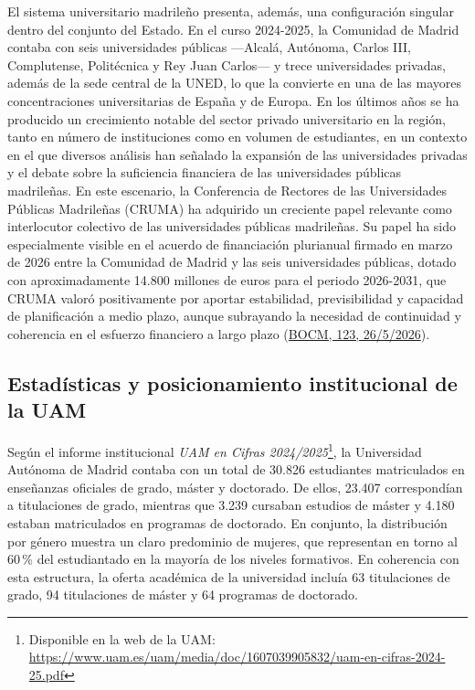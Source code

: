 \documentclass[
  11pt,
  a4paper,
  twoside]{scrreprt}
\begin{document}
El sistema universitario madrileño presenta, además, una configuración
singular dentro del conjunto del Estado. En el curso 2024-2025, la
Comunidad de Madrid contaba con seis universidades públicas ---Alcalá,
Autónoma, Carlos III, Complutense, Politécnica y Rey Juan Carlos--- y
trece universidades privadas, además de la sede central de la UNED, lo
que la convierte en una de las mayores concentraciones universitarias de
España y de Europa. En los últimos años se ha producido un crecimiento
notable del sector privado universitario en la región, tanto en número
de instituciones como en volumen de estudiantes, en un contexto en el
que diversos análisis han señalado la expansión de las universidades
privadas y el debate sobre la suficiencia financiera de las
universidades públicas madrileñas. En este escenario, la Conferencia de
Rectores de las Universidades Públicas Madrileñas (CRUMA) ha adquirido
un creciente papel relevante como interlocutor colectivo de las
universidades públicas madrileñas. Su papel ha sido especialmente
visible en el acuerdo de financiación plurianual firmado en marzo de
2026 entre la Comunidad de Madrid y las seis universidades públicas,
dotado con aproximadamente 14.800 millones de euros para el periodo
2026-2031, que CRUMA valoró positivamente por aportar estabilidad,
previsibilidad y capacidad de planificación a medio plazo, aunque
subrayando la necesidad de continuidad y coherencia en el esfuerzo
financiero a largo plazo
(\href{https://www.bocm.es/boletin/CM_Orden_BOCM/2026/05/26/BOCM-20260526-5.PDF}{BOCM,
123, 26/5/2026}).

\subsection{Estadísticas y posicionamiento institucional de la
UAM}\label{estaduxedsticas-y-posicionamiento-institucional-de-la-uam}

Según el informe institucional \emph{UAM en Cifras
2024/2025}\footnote{Disponible en la web de la UAM:
  \url{https://www.uam.es/uam/media/doc/1607039905832/uam-en-cifras-2024-25.pdf}},
la Universidad Autónoma de Madrid contaba con un total de 30.826
estudiantes matriculados en enseñanzas oficiales de grado, máster y
doctorado. De ellos, 23.407 correspondían a titulaciones de grado,
mientras que 3.239 cursaban estudios de máster y 4.180 estaban
matriculados en programas de doctorado. En conjunto, la distribución por
género muestra un claro predominio de mujeres, que representan en torno
al 60\,\% del estudiantado en la mayoría de los niveles formativos. En
coherencia con esta estructura, la oferta académica de la universidad
incluía 63 titulaciones de grado, 94 titulaciones de máster y 64
programas de doctorado.
\end{document}
